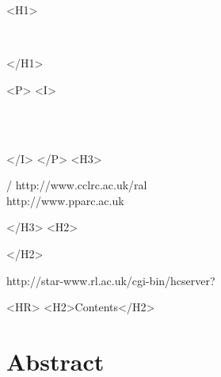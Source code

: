 \begin{htmlonly}
   \xlabel{}
   \begin{rawhtml} <H1> \end{rawhtml}
      \stardoctitle\\
      \stardoconeline
   \begin{rawhtml} </H1> \end{rawhtml}


   \begin{rawhtml} <P> <I> \end{rawhtml}
   \stardoccategory \stardocnumber \\
   \stardocauthors \\
   \stardocdate
   \begin{rawhtml} </I> </P> <H3> \end{rawhtml}
       /
                        {http://www.cclrc.ac.uk/ral} \\
                        {http://www.pparc.ac.uk} \\
   \begin{rawhtml} </H3> <H2> \end{rawhtml}
   \begin{rawhtml} </H2> \end{rawhtml}
      {http://star-www.rl.ac.uk/cgi-bin/hcserver?\stardocsource}\\

  \label{stardoccontents}
  \begin{rawhtml}
    <HR>
    <H2>Contents</H2>
  \end{rawhtml}
  \renewcommand{\latexonlytoc}[0]{}

  \section{Abstract}
\end{htmlonly}

